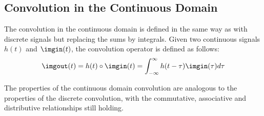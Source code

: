 \subsection{Convolution in the Continuous Domain}
%
%
The convolution in the continuous domain is defined in the same way as with discrete signals but replacing the sums by integrals. Given two continuous signals $h(t)$ and $\imgin(t)$, the convolution operator is defined as follows:
\begin{equation}
\imgout(t) = h(t) \circ \imgin (t) = \int_{-\infty}^{\infty} h(t-\tau) \imgin (\tau) d\tau
\end{equation}

The properties of the continuous domain convolution are analogous to the properties of the discrete convolution, with the commutative, associative and distributive relationships still holding. 

